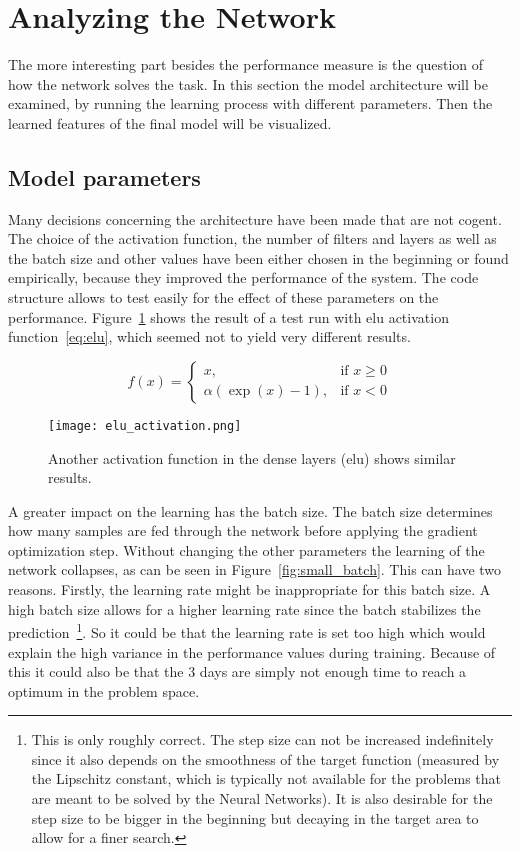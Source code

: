 \documentclass[main.tex]{subfiles}
\begin{document}
\section{Analyzing the Network}
The more interesting part besides the performance measure is the question of how the network solves the task. In this section the model architecture will be examined, by running the learning process with different parameters. Then the learned features of the final model will be visualized.


\subsection{Model parameters}
Many decisions concerning the architecture have been made that are not cogent. The choice of the activation function, the number of filters and layers as well as the batch size and other values have been either chosen in the beginning or found empirically, because they improved the performance of the system. The code structure allows to test easily for the effect of these parameters on the performance. Figure~\ref{fig:other_act} shows the result of a test run with elu activation function~\ref{eq:elu}, which seemed not to yield very different results.

\begin{equation} \label{eq:elu}
f(x)= \begin{cases}
    x,& \text{if } x\geq 0\\
    \alpha\left(\exp(x) - 1\right), & \text{if } x < 0
    \end{cases}
\end{equation}

\begin{figure}
\begin{center}
\texttt{[image: elu\_activation.png]}
\end{center}
\caption{Another activation function in the dense layers (elu) shows similar results.}
\label{fig:other_act}
\end{figure}

A greater impact on the learning has the batch size. The batch size determines how many samples are fed through the network before applying the gradient optimization step. Without changing the other parameters the learning of the network collapses, as can be seen in Figure~\ref{fig:small_batch}. This can have two reasons. Firstly, the learning rate might be inappropriate for this batch size. A high batch size allows for a higher learning rate since the batch stabilizes the prediction~\footnote{This is only roughly correct. The step size can not be increased indefinitely since it also depends on the smoothness of the target function (measured by the Lipschitz constant, which is typically not available for the problems that are meant to be solved by the Neural Networks). It is also desirable for the step size to be bigger in the beginning but decaying in the target area to allow for a finer search.}. So it could be that the learning rate is set too high which would explain the high variance in the performance values during training. Because of this it could also be that the 3 days are simply not enough time to reach a optimum in the problem space.
 
\end{document}
